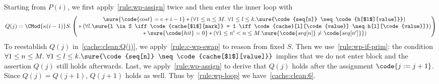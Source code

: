 \documentclass[acmsmall,nonacm,screen,appendix]{acmart}
\begin{document}
Starting from $P(i)$, we first apply~\ref{rule:wp-assign} twice
and then enter the inner loop with
\begin{align*}
  Q(j) =
      \CMod{\kappa(i-1)} S.
        \begin{pmatrix}
          \sure{\code{cost} = c + i - 1} \ast \left( \forall 1 \leq n\leq M.\  \forall 1 \leq l \leq k. \sure{\code{seq[n]} \neq \code{h[$l$][value]}} \right)\\
             {} \ast \left( \forall l. \sure{l \in S \iff \code{cache[$l$][mark]} = 1 \iff \code{cache}[l][\code{value}] \neq h[l][\code{value}]}\right) \\
             {} \ast \sure{\code{hit} = 0}
             \ast \left(\forall 1 \leq n' < n \leq M. \sure{\code{seq[n]} \neq \code{seq[n']}} \right)\\
        \end{pmatrix}
\end{align*}
To reestablish $Q(j)$ in~\eqref{cache:clean:Q(j)},
we apply~\ref{rule:c-wp-swap} to reason from fixed $S$. Then we
use~\ref{rule:wp-if-prim}:
the condition $ \forall 1 \leq n\leq M.\  \forall 1 \leq l \leq k. \sure{\code{seq[n]} \neq \code{cache[$l$][value]}}$ implies that we do not enter  block and
the assertion $Q(j)$ still holds afterwards. Last, we
apply~\ref{rule:wp-assign} to derive that $Q(j)$ holds
after the assignment $\code{j := j+1}$. Since $Q(j) = Q(j+1)$,
$Q(j + 1)$ holds as well.
Thus by~\ref{rule:wp-loop} we have~\eqref{cache:clean:6}.
\end{document}
